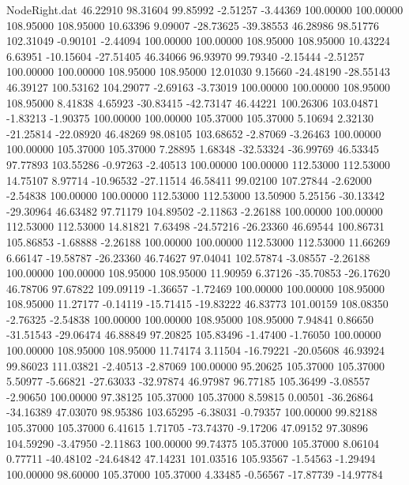 \begin{filecontents}{NodeRight.dat}
  46.22910   98.31604   99.85992    -2.51257   -3.44369  100.00000  100.00000  108.95000  108.95000   10.63396    9.09007  -28.73625  -39.38553
  46.28986   98.51776  102.31049    -0.90101   -2.44094  100.00000  100.00000  108.95000  108.95000   10.43224    6.63951  -10.15604  -27.51405
  46.34066   96.93970   99.79340    -2.15444   -2.51257  100.00000  100.00000  108.95000  108.95000   12.01030    9.15660  -24.48190  -28.55143
  46.39127  100.53162  104.29077    -2.69163   -3.73019  100.00000  100.00000  108.95000  108.95000    8.41838    4.65923  -30.83415  -42.73147
  46.44221  100.26306  103.04871    -1.83213   -1.90375  100.00000  100.00000  105.37000  105.37000    5.10694    2.32130  -21.25814  -22.08920
  46.48269   98.08105  103.68652    -2.87069   -3.26463  100.00000  100.00000  105.37000  105.37000    7.28895    1.68348  -32.53324  -36.99769
  46.53345   97.77893  103.55286    -0.97263   -2.40513  100.00000  100.00000  112.53000  112.53000   14.75107    8.97714  -10.96532  -27.11514
  46.58411   99.02100  107.27844    -2.62000   -2.54838  100.00000  100.00000  112.53000  112.53000   13.50900    5.25156  -30.13342  -29.30964
  46.63482   97.71179  104.89502    -2.11863   -2.26188  100.00000  100.00000  112.53000  112.53000   14.81821    7.63498  -24.57216  -26.23360
  46.69544  100.86731  105.86853    -1.68888   -2.26188  100.00000  100.00000  112.53000  112.53000   11.66269    6.66147  -19.58787  -26.23360
  46.74627   97.04041  102.57874    -3.08557   -2.26188  100.00000  100.00000  108.95000  108.95000   11.90959    6.37126  -35.70853  -26.17620
  46.78706   97.67822  109.09119    -1.36657   -1.72469  100.00000  100.00000  108.95000  108.95000   11.27177   -0.14119  -15.71415  -19.83222
  46.83773  101.00159  108.08350    -2.76325   -2.54838  100.00000  100.00000  108.95000  108.95000    7.94841    0.86650  -31.51543  -29.06474
  46.88849   97.20825  105.83496    -1.47400   -1.76050  100.00000  100.00000  108.95000  108.95000   11.74174    3.11504  -16.79221  -20.05608
  46.93924   99.86023  111.03821    -2.40513   -2.87069  100.00000   95.20625  105.37000  105.37000    5.50977   -5.66821  -27.63033  -32.97874
  46.97987   96.77185  105.36499    -3.08557   -2.90650  100.00000   97.38125  105.37000  105.37000    8.59815    0.00501  -36.26864  -34.16389
  47.03070   98.95386  103.65295    -6.38031   -0.79357  100.00000   99.82188  105.37000  105.37000    6.41615    1.71705  -73.74370   -9.17206
  47.09152   97.30896  104.59290    -3.47950   -2.11863  100.00000   99.74375  105.37000  105.37000    8.06104    0.77711  -40.48102  -24.64842
  47.14231  101.03516  105.93567    -1.54563   -1.29494  100.00000   98.60000  105.37000  105.37000    4.33485   -0.56567  -17.87739  -14.97784

\end{filecontents}
